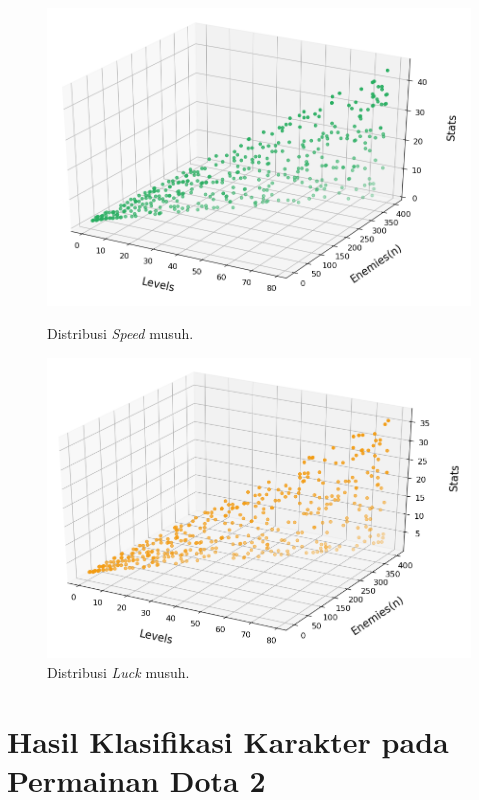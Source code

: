 \begin{figure} [!h] \centering
	\includegraphics[scale=0.6]{img/EnemySpeedDistrib.png}
	\caption{Distribusi \textit{Speed} musuh.}
	\label{fig:enemy_spd_distrib}
	\vspace{5ex}

	\includegraphics[scale=0.6]{img/EnemyLuckDistrib.png}
	\caption{Distribusi \textit{Luck} musuh.}
	\label{fig:enemy_luck_distrib}
\end{figure}
\clearpage

\section{Hasil Klasifikasi Karakter pada Permainan Dota 2}
\label{sec:sec4_eval_dota2}
\vspace{1ex}

